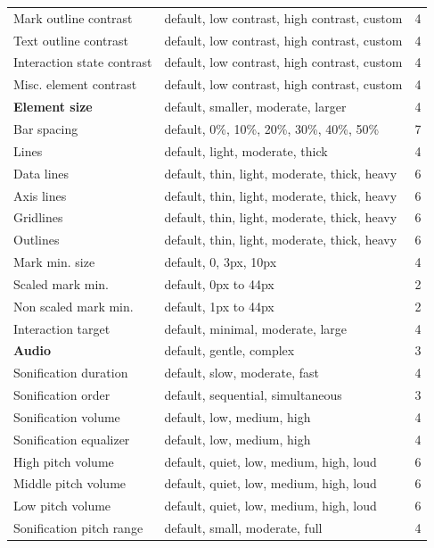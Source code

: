 \documentclass[12pt]{cmuthesis}
\begin{document}
{\begin{longtable}{@{}l p{7.2cm} r@{}}
\quad Mark outline contrast & default, low contrast, high contrast, custom & 4 \\
\quad Text outline contrast & default, low contrast, high contrast, custom & 4 \\
\quad Interaction state contrast & default, low contrast, high contrast, custom & 4 \\
\quad Misc. element contrast & default, low contrast, high contrast, custom & 4 \\
\addlinespace
\textbf{Element size} & default, smaller, moderate, larger & 4 \\
\quad Bar spacing & default, 0\%, 10\%, 20\%, 30\%, 40\%, 50\% & 7 \\
\quad Lines & default, light, moderate, thick & 4 \\
\qquad Data lines & default, thin, light, moderate, thick, heavy & 6 \\
\qquad Axis lines & default, thin, light, moderate, thick, heavy & 6 \\
\qquad Gridlines & default, thin, light, moderate, thick, heavy & 6 \\
\qquad Outlines & default, thin, light, moderate, thick, heavy & 6 \\
\quad Mark min. size & default, 0, 3px, 10px & 4 \\
\qquad Scaled mark min. & default, 0px to 44px & 2 \\
\qquad Non scaled mark min. & default, 1px to 44px & 2 \\
\quad Interaction target & default, minimal, moderate, large & 4 \\
\addlinespace
\textbf{Audio} & default, gentle, complex & 3 \\
\quad Sonification duration & default, slow, moderate, fast & 4 \\
\quad Sonification order & default, sequential, simultaneous & 3 \\
\quad Sonification volume & default, low, medium, high & 4 \\
\quad Sonification equalizer & default, low, medium, high & 4 \\
\qquad High pitch volume & default, quiet, low, medium, high, loud & 6 \\
\qquad Middle pitch volume & default, quiet, low, medium, high, loud & 6 \\
\qquad Low pitch volume & default, quiet, low, medium, high, loud & 6 \\
\quad Sonification pitch range & default, small, moderate, full & 4 \\

\end{longtable}}
\end{document}
